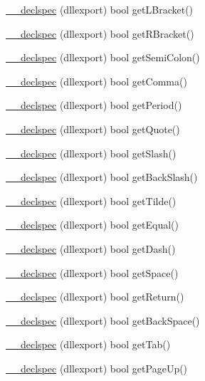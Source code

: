 \begin{DoxyCompactItemize}
\hyperlink{class_update_data_ab193a5b76215a94a599b946dc42e913e}{\-\_\-\-\_\-declspec} (dllexport) bool get\-L\-Bracket()
\item 
\hyperlink{class_update_data_a8212e00e1a7f6accbadf1c17bd85d99e}{\-\_\-\-\_\-declspec} (dllexport) bool get\-R\-Bracket()
\item 
\hyperlink{class_update_data_a61875fb8d78111b88f79f603b5f7da76}{\-\_\-\-\_\-declspec} (dllexport) bool get\-Semi\-Colon()
\item 
\hyperlink{class_update_data_a1122a9c664e160133f8bbc46057df989}{\-\_\-\-\_\-declspec} (dllexport) bool get\-Comma()
\item 
\hyperlink{class_update_data_a95b032a32d529ce4ce86e6db8e3e5fb3}{\-\_\-\-\_\-declspec} (dllexport) bool get\-Period()
\item 
\hyperlink{class_update_data_ad99a20bdbd06056b2b0e57fd1944ba79}{\-\_\-\-\_\-declspec} (dllexport) bool get\-Quote()
\item 
\hyperlink{class_update_data_ac29f62411bac84c0b9c6c22b89bd1f0c}{\-\_\-\-\_\-declspec} (dllexport) bool get\-Slash()
\item 
\hyperlink{class_update_data_a579c5f3f66610d50e24c82598c14bb1d}{\-\_\-\-\_\-declspec} (dllexport) bool get\-Back\-Slash()
\item 
\hyperlink{class_update_data_a5a1750d7b68b9161207d68c8c5a4ade1}{\-\_\-\-\_\-declspec} (dllexport) bool get\-Tilde()
\item 
\hyperlink{class_update_data_aeda9976a441f25dd951a5e562e2011e9}{\-\_\-\-\_\-declspec} (dllexport) bool get\-Equal()
\item 
\hyperlink{class_update_data_adbeb3f2a86cd540c388fdde29fe3052b}{\-\_\-\-\_\-declspec} (dllexport) bool get\-Dash()
\item 
\hyperlink{class_update_data_a5ceab3fd6e1206d7a0f671c318c53123}{\-\_\-\-\_\-declspec} (dllexport) bool get\-Space()
\item 
\hyperlink{class_update_data_adcf599f0605244b33162f2e121574a76}{\-\_\-\-\_\-declspec} (dllexport) bool get\-Return()
\item 
\hyperlink{class_update_data_ad49791aff0618209a7db5b8ef1c9d7a2}{\-\_\-\-\_\-declspec} (dllexport) bool get\-Back\-Space()
\item 
\hyperlink{class_update_data_aa4e19845288eae54428b66dc2223f4c3}{\-\_\-\-\_\-declspec} (dllexport) bool get\-Tab()
\item 
\hyperlink{class_update_data_a0994ce9e11112dd06c1b229ded036eb8}{\-\_\-\-\_\-declspec} (dllexport) bool get\-Page\-Up()
\item 

\end{DoxyCompactItemize}
